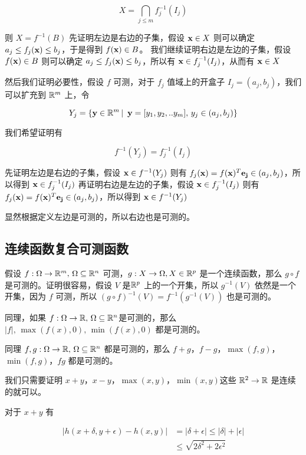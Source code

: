 \[
X = \bigcap_{j \le m}f_j^{-1}(I_j)
\]

则 $X = f^{-1}(B)$ 先证明左边是右边的子集，假设 $\mathbf{x} \in X$ 则可以确定 $a_j \le f_j(\mathbf{x}) \le b_j$，于是得到 $f(\mathbf{x}) \in B$。
我们继续证明右边是左边的子集，假设 $f(\mathbf{x}) \in B$ 则可以确定 $a_j \le f_j(\mathbf{x}) \le b_j$，所以有 $\mathbf{x} \in f_j^{-1}(I_j) $，从而有
$\mathbf{x} \in X$


然后我们证明必要性，假设 $f$ 可测，对于 $f_j$ 值域上的开盒子 $I_j = (a_j, b_j)$，我们可以扩充到 $\mathbb{R}^m$ 上，令

\[
Y_j = \{ \mathbf{y} \in \mathbb{R}^m \,\vert\,\ \mathbf{y} = [y_1, y_2, .. y_m] ,\, y_j \in (a_j, b_j)\}
\]

我们希望证明有

\[
f^{-1}(Y_j) = f_j^{-1}(I_j)
\]

先证明左边是右边的子集，假设 $\mathbf{x} \in f^{-1}(Y_j)$ 则有 $f_j(\mathbf{x}) = f(\mathbf{x})^T \mathbf{e_j} \in (a_j, b_j)$，所以得到 $\mathbf{x} \in f_j^{-1}(I_j)$
再证明右边是左边的子集，假设 $\mathbf{x} \in f_j^{-1}(I_j)$ 则有 $f_j(\mathbf{x}) = f(\mathbf{x})^T \mathbf{e_j} \in (a_j, b_j)$，所以得到 $\mathbf{x} \in f^{-1}(Y_j)$

显然根据定义左边是可测的，所以右边也是可测的。

\subsection{连续函数复合可测函数}

假设 $f: \Omega \to \mathbb{R}^m,\, \Omega \subseteq \mathbb{R}^n$ 可测，$g: X \to \Omega, X \in \mathbb{R}^p$ 是一个连续函数，那么 $g \circ f$ 是可测的。证明很容易，假设 $V$ 是$\mathbb{R}^p$ 上的一个开集，所以
$g^{-1}(V)$ 依然是一个开集，因为 $f$ 可测，所以 $ (g \circ f)^{-1}(V) = f^{-1}(g^{-1}(V))$ 也是可测的。

同理，如果 $f: \Omega\to \mathbb{R},\, \Omega \subseteq \mathbb{R}^n$是可测的，那么 $\lvert f \rvert,\, \max(f(x), 0), \, \min(f(x), 0)$ 都是可测的。

同理 $f, g: \Omega\to \mathbb{R},\, \Omega \subseteq \mathbb{R}^n$ 都是可测的，那么 $f +g$，$f-g$，$\max(f,g)$，$\min(f,g)$，$fg$ 都是可测的。

我们只需要证明 $x+y$，$x-y$，$\max(x,y)$，$\min(x,y)$这些 $\mathbb{R}^2 \to \mathbb{R}$ 是连续的就可以。

对于 $x+y$ 有 

\begin{align*}
\lvert h(x+\delta, y+\epsilon) - h(x,y) \rvert &= \lvert \delta + \epsilon \rvert \le \lvert \delta \rvert + \lvert \epsilon \rvert \\
& \le \sqrt{2\delta^2 + 2\epsilon^2}
\end{align*}

